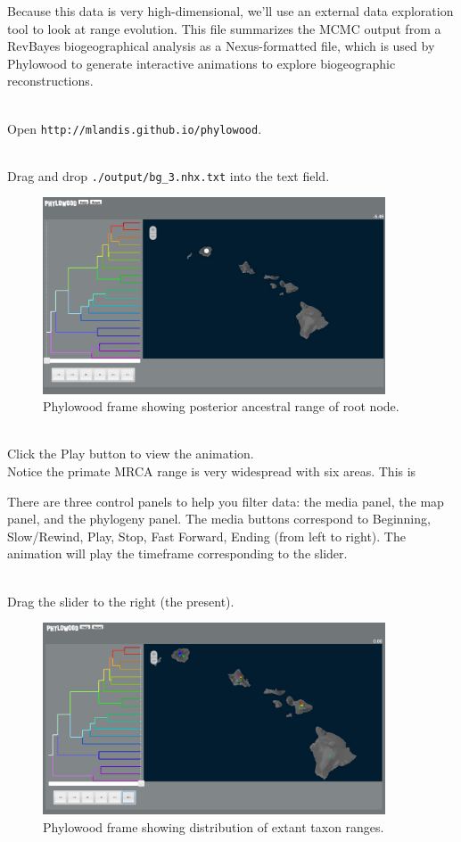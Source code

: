 Because this data is very high-dimensional, we'll use an external data exploration tool to look at range evolution.
This file summarizes the MCMC output from a RevBayes biogeographical analysis as a Nexus-formatted file, which is used by Phylowood to generate interactive animations to explore biogeographic reconstructions.

\noindent \\ \impmark Open \texttt{http://mlandis.github.io/phylowood}.

\noindent \\ \impmark Drag and drop \texttt{./output/bg\_3.nhx.txt} into the text field.

\begin{figure}[H]
\centering
\includegraphics[width=4in]{figures/phw_mrca}
\caption{Phylowood frame showing posterior ancestral range of root node.}
\end{figure}

\noindent \\ \impmark Click the Play button to view the animation. \\

Notice the primate MRCA range is very widespread with six areas. This is

There are three control panels to help you filter data: the media panel, the map panel, and the phylogeny panel.
The media buttons correspond to Beginning, Slow/Rewind, Play, Stop, Fast Forward, Ending (from left to right).
The animation will play the timeframe corresponding to the slider.

\noindent \\ \impmark Drag the slider to the right (the present).

\begin{figure}[H]
\centering
\includegraphics[width=4in]{figures/phw_all}
\caption{Phylowood frame showing distribution of extant taxon ranges.}
\end{figure}

